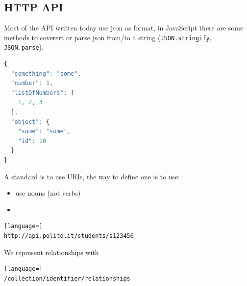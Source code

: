 \documentclass[12pt]{article}
\begin{document}
\subsection{HTTP API}
Most of the API written today use json as format, in JavaScript there are some methods to coverert or parse json from/to a string (\texttt{JSON.stringify}, \texttt{JSON.parse}).
\begin{lstlisting}[language=js]
{
  "something": "some",
  "number": 1,
  "listOfNumbers": [
    1, 2, 3
  ],
  "object": {
    "some": "some",
    "id": 10
  }
}
\end{lstlisting}
A standard is to use URIs, the way to define one is to use:
\begin{itemize}
  \item use nouns (not verbs)
  \item 
\end{itemize}
\begin{lstlisting}[language=]
http://api.polito.it/students/s123456
\end{lstlisting}
We represent relationships with
\begin{lstlisting}[language=]
/collection/identifier/relationships
\end{lstlisting}
\end{document}
